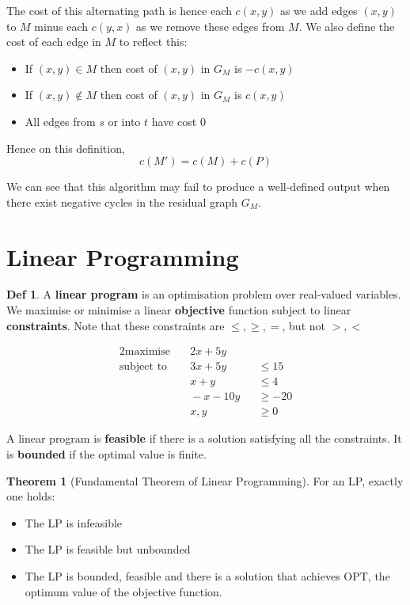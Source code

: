 \documentclass{article}
\theoremstyle{plain}
\theoremstyle{definition}
\newtheorem{thm}{Theorem}
\newtheorem{defn}[dummy]{Def}
\begin{document}
    The cost of this alternating path is hence each $c(x,y)$ as we add edges $(x,y)$ to $M$ minus each $c(y,x)$ as we remove these edges from $M$. We also define the cost of each edge in $M$ to reflect this:
    \begin{itemize}
        \item If $(x, y) \in M$ then cost of $(x,y)$ in $G_M$ is $-c(x,y)$
        \item If $(x, y) \notin M$ then cost of $(x,y)$ in $G_M$ is $c(x,y)$
        \item All edges from $s$ or into $t$ have cost $0$
    \end{itemize}
    Hence on this definition, 
    \[ c(M') = c(M) + c(P) \]
    
    We can see that this algorithm may fail to produce a well-defined output when there exist negative cycles in the residual graph $G_M$. 

\section{Linear Programming}

    \begin{defn}
         A \textbf{linear program} is an optimisation problem over real-valued variables. We maximise or minimise a linear \textbf{objective} function subject to linear \textbf{constraints}. Note that these constraints are $\leq, \geq, =$, but not $>, <$
    \end{defn}
    \begin{alignat*}{2}
        \text{maximise} &\quad 2x + 5y  && \\
        \text{subject to} &\quad 3x + 5y &&\leq 15 \\
        &\quad x + y &&\leq 4 \\
        &\quad -x - 10y &&\geq -20 \\
        &\quad x,y &&\geq 0
    \end{alignat*}

    A linear program is \textbf{feasible} if there is a solution satisfying all the constraints. It is \textbf{bounded} if the optimal value is finite. 
    \begin{thm}[Fundamental Theorem of Linear Programming]
        For an LP, exactly one holds:
        \begin{itemize}
            \item The LP is infeasible
            \item The LP is feasible but unbounded
            \item The LP is bounded, feasible and there is a solution that achieves OPT, the optimum value of the objective function. 
        \end{itemize}
    \end{thm}
\end{document}
